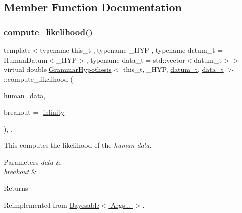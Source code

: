 \subsection{Member Function Documentation}
\mbox{\label{class_grammar_hypothesis_a769eea50d9e40668022b120b6fddfe06}} 
\subsubsection{\texorpdfstring{compute\+\_\+likelihood()}{compute\_likelihood()}}
{\footnotesize\ttfamily template$<$typename this\+\_\+t , typename \+\_\+\+H\+YP , typename datum\+\_\+t  = Human\+Datum$<$\+\_\+\+H\+Y\+P$>$, typename data\+\_\+t  = std\+::vector$<$datum\+\_\+t$>$$>$ \\
virtual double \hyperlink{class_grammar_hypothesis}{Grammar\+Hypothesis}$<$ this\+\_\+t, \+\_\+\+H\+YP, \hyperlink{class_bayesable_a9f1a6c0cd7855550fa10b1a8f13a5867}{datum\+\_\+t}, \hyperlink{class_bayesable_aa2788c4d7718c0a824e1d28c4c98f921}{data\+\_\+t} $>$\+::compute\+\_\+likelihood (\begin{DoxyParamCaption}\item[{const \hyperlink{class_bayesable_aa2788c4d7718c0a824e1d28c4c98f921}{data\+\_\+t} \&}]{human\+\_\+data,  }\item[{const double}]{breakout = {\ttfamily -\/\hyperlink{_numerics_8h_af9434aea82baf2f6a5d9b6f9e36db08e}{infinity}} }\end{DoxyParamCaption})\hspace{0.3cm}{\ttfamily [inline]}, {\ttfamily [override]}, {\ttfamily [virtual]}}



This computes the likelihood of the {\itshape human data}. 


\begin{DoxyParams}{Parameters}
{\em data} & \\
\hline
{\em breakout} & \\
\hline
\end{DoxyParams}
\begin{DoxyReturn}{Returns}

\end{DoxyReturn}


Reimplemented from \hyperlink{class_bayesable_a202493156cec15937bee304d807fdbdb}{Bayesable$<$ Args... $>$}.

